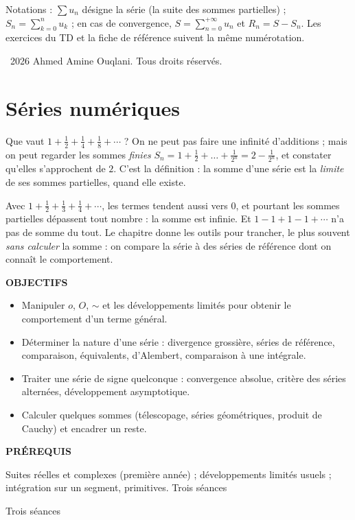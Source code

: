 \documentclass[a4paper,11pt]{article}
\numberwithin{equation}{section}
\numberwithin{figure}{section}
\numberwithin{table}{section}
\theoremstyle{enonce}
\theoremstyle{exemple}
\theoremstyle{remarque}
\newcommand{\ouverture}[3]{%
  \begin{tcolorbox}[enhanced,colback=Fond,colframe=Fond,arc=0pt,boxrule=0pt,left=12pt,right=12pt,top=10pt,bottom=10pt,
     before skip=1.2em,after skip=1.6em]
  \begin{minipage}[t]{0.56\linewidth}
  {\sffamily\bfseries\small\color{Bleu}OBJECTIFS}\par\vspace{0.3em}\small #1
  \end{minipage}\hfill
  \begin{minipage}[t]{0.38\linewidth}
  {\sffamily\bfseries\small\color{Bleu}PRÉREQUIS}\par\vspace{0.3em}\small #2
  \ifx\relax#3\relax\else\par\vspace{0.6em}{\sffamily\bfseries\small\color{Bleu}DURÉE}\par\vspace{0.2em}\small #3\fi
  \end{minipage}
  \end{tcolorbox}}
\newif\ifonglets \ongletsfalse
\begin{document}
Notations : $\sum u_n$ désigne la série (la suite des sommes partielles) ; $S_n=\sum_{k=0}^nu_k$ ; en cas de convergence,
$S=\sum_{n=0}^{+\infty}u_n$ et $R_n=S-S_n$. Les exercices du TD et la fiche de référence suivent la même numérotation.

\vfill
{\footnotesize\sffamily\color{Gris}\textcopyright~2026 Ahmed Amine Ouqlani. Tous droits réservés.\par}
\clearpage
\thispagestyle{plain}
\hypertarget{toc}{}
\renewcommand{\contentsname}{Sommaire}
\tableofcontents
\clearpage
{}
\ongletstrue
\section{Séries numériques}\label{sec:series}

Que vaut $1+\frac12+\frac14+\frac18+\cdots$ ? On ne peut pas faire une infinité d'additions ; mais on peut regarder les
sommes \emph{finies} $S_n=1+\frac12+\dots+\frac1{2^n}=2-\frac1{2^n}$, et constater qu'elles s'approchent de $2$. C'est la
définition : la somme d'une série est la \emph{limite} de ses sommes partielles, quand elle existe.

Avec $1+\frac12+\frac13+\frac14+\cdots$, les termes tendent aussi vers $0$, et pourtant les sommes partielles dépassent tout
nombre : la somme est infinie. Et $1-1+1-1+\cdots$ n'a pas de somme du tout. Le chapitre donne les outils pour trancher, le plus
souvent \emph{sans calculer} la somme : on compare la série à des séries de référence dont on connaît le comportement.

\ouverture{%
\begin{itemize}[leftmargin=1.1em,itemsep=1pt]
\item Manipuler $o$, $O$, $\sim$ et les développements limités pour obtenir le comportement d'un terme général.
\item Déterminer la nature d'une série : divergence grossière, séries de référence, comparaison, équivalents, d'Alembert,
comparaison à une intégrale.
\item Traiter une série de signe quelconque : convergence absolue, critère des séries alternées, développement asymptotique.
\item Calculer quelques sommes (télescopage, séries géométriques, produit de Cauchy) et encadrer un reste.
\end{itemize}}{%
Suites réelles et complexes (première année) ; développements limités usuels ; intégration sur un segment, primitives.}{Trois séances}
\end{document}

